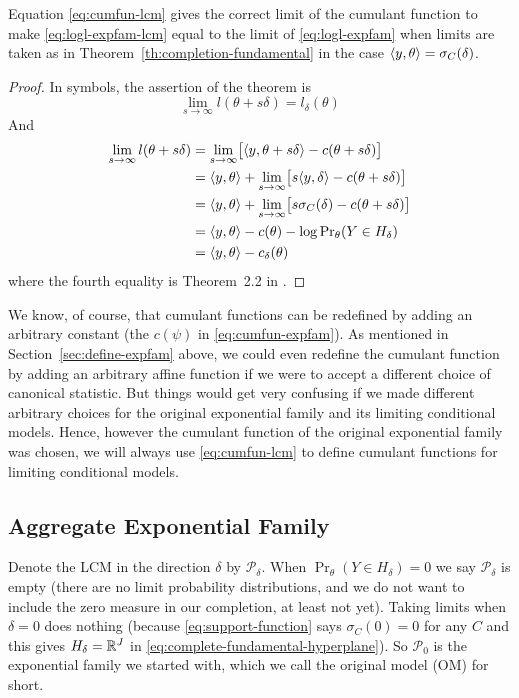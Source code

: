 \begin{theorem} \label{th:cumfun-lcm}
Equation \eqref{eq:cumfun-lcm} gives the correct limit of the cumulant function
to make \eqref{eq:logl-expfam-lcm} equal to the limit of \eqref{eq:logl-expfam}
when limits are taken as in Theorem~\ref{th:completion-fundamental}
in the case $\langle y, \theta \rangle = \sigma_C(\delta)$.
\end{theorem}
\begin{proof}
In symbols, the assertion of the theorem is
$$
   \lim_{s \to \infty} l(\theta + s \delta)
   =
   l_\delta(\theta)
$$
And
\begin{align*}
   \lim_{s \to \infty} l(\theta + s \delta)
   & =
   \lim_{s \to \infty}
   \bigl[ \langle y, \theta + s \delta \rangle - c(\theta + s \delta) \bigr]
   \\
   & =
   \langle y, \theta \rangle + \lim_{s \to \infty}
   \bigl[ s \langle y, \delta \rangle - c(\theta + s \delta) \bigr]
   \\
   & =
   \langle y, \theta \rangle + \lim_{s \to \infty}
   \bigl[ s \sigma_C(\delta) - c(\theta + s \delta) \bigr]
   \\
   & =
   \langle y, \theta \rangle - c(\theta) - \log \Pr\nolimits_\theta(Y \in H_\delta)
   \\
   & =
   \langle y, \theta \rangle - c_\delta(\theta)
\end{align*}
where the fourth equality is Theorem~{2.2} in \citet{geyer-thesis}.
\end{proof}

We know, of course, that cumulant functions can be redefined by adding an
arbitrary constant (the $c(\psi)$ in \eqref{eq:cumfun-expfam}).
As mentioned in Section~\ref{sec:define-expfam} above, we could even redefine
the cumulant function by adding an arbitrary affine function if we were to
accept a different choice of canonical statistic.  But things would get
very confusing if we made different arbitrary choices for the original
exponential family and its limiting conditional models.  Hence, however
the cumulant function of the original exponential family was chosen, we
will always use \eqref{eq:cumfun-lcm} to define cumulant functions
for limiting conditional models.

\subsection{Aggregate Exponential Family}

Denote the LCM in the direction $\delta$ by $\mathcal{P}_\delta$.
When $\Pr_\theta(Y \in H_\delta) = 0$ we say $\mathcal{P}_\delta$ is empty
(there are no limit probability distributions, and we do not want to include
the zero measure in our completion, at least not yet).
Taking limits when $\delta = 0$ does nothing
(because \eqref{eq:support-function} says $\sigma_C(0) = 0$ for any $C$
and this gives $H_\delta = \mathbb{R}^J$
in \eqref{eq:complete-fundamental-hyperplane}).
So $\mathcal{P}_0$ is the exponential family we started with, which we
call the original model (OM) for short.

